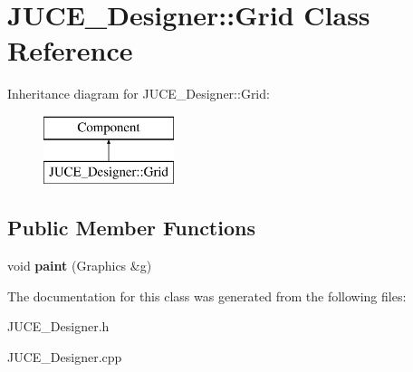 \hypertarget{class_j_u_c_e___designer_1_1_grid}{\section{J\-U\-C\-E\-\_\-\-Designer\-:\-:Grid Class Reference}
\label{class_j_u_c_e___designer_1_1_grid}
}
Inheritance diagram for J\-U\-C\-E\-\_\-\-Designer\-:\-:Grid\-:\begin{figure}[H]
\begin{center}
\leavevmode
\includegraphics[height=2.000000cm]{class_j_u_c_e___designer_1_1_grid}
\end{center}
\end{figure}
\subsection*{Public Member Functions}
\begin{DoxyCompactItemize}
\item 
\hypertarget{class_j_u_c_e___designer_1_1_grid_a2cb60e91219a599c0b03f72fc0be37c5}{void {\bfseries paint} (Graphics \&g)}\label{class_j_u_c_e___designer_1_1_grid_a2cb60e91219a599c0b03f72fc0be37c5}

\end{DoxyCompactItemize}


The documentation for this class was generated from the following files\-:\begin{DoxyCompactItemize}
\item 
J\-U\-C\-E\-\_\-\-Designer.\-h\item 
J\-U\-C\-E\-\_\-\-Designer.\-cpp\end{DoxyCompactItemize}
